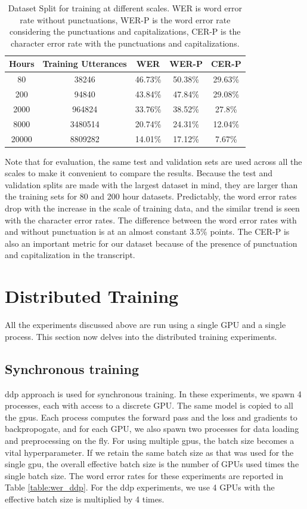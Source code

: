 \begin{table}[ht]
\centering
\begin{tabular}{c c c c c}
\hline
  Hours & Training Utterances & WER & WER-P & CER-P\\
 \hline
  80 & 38246 & 46.73\% & 50.38\% & 29.63\%\\ 
  200 & 94840 & 43.84\% & 47.84\% & 29.08\%\\
  2000 & 964824 & 33.76\% & 38.52\% & 27.8\%\\
  8000 & 3480514 & 20.74\% & 24.31\% & 12.04\%\\
  20000 & 8809282 & 14.01\% & 17.12\% & 7.67\%\\
 \hline
\end{tabular}
\caption{\label{table:datascales}Dataset Split for training at different scales. WER is word error rate without punctuations, WER-P is the word error rate considering the punctuations and capitalizations, CER-P is the character error rate with the punctuations and capitalizations. }
\end{table}

Note that for evaluation, the same test and validation sets are used across all the scales to make it convenient to compare the results. Because the test and validation splits are made with the largest dataset in mind, they are larger than the training sets for 80 and 200 hour datasets. Predictably, the word error rates drop with the increase in the scale of training data, and the similar trend is seen with the character error rates. The difference between the word error rates with and without punctuation is at an almost constant 3.5\% points. The CER-P is also an important metric for our dataset because of the presence of punctuation and capitalization in the transcript.

\section{Distributed Training}
\label{section:res_dist}
All the experiments discussed above are run using a single GPU and a single process. This section now delves into the distributed training experiments. 

\subsection{Synchronous training}
\acrfull{ddp} approach is used for synchronous training. In these experiments, we spawn 4 processes, each with access to a discrete GPU. The same model is copied to all the \acrshort{gpu}s. Each process computes the forward pass and the loss and gradients to backpropogate, and for each GPU, we also spawn two processes for data loading and preprocessing on the fly. For using multiple \acrshort{gpu}s, the batch size becomes a vital hyperparameter. If we retain the same batch size as that was used for the single \acrshort{gpu}, the overall effective batch size is the number of GPUs used times the single batch size. The word error rates for these experiments are reported in Table \ref{table:wer_ddp}. For the \acrshort{ddp} experiments, we use 4 GPUs with the effective batch size is multiplied by 4 times. 

